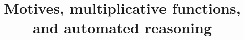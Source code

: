 \documentclass{beamer}
\title[Tannakian symbols]{Motives, multiplicative functions, and automated reasoning}
\begin{document}
\begin{frame} \frametitle{\insertsection}
  \titlepage

\end{frame}
\end{document}
